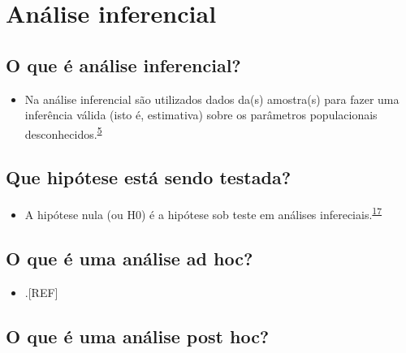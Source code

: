 \documentclass[
]{book}
\providecommand{\tightlist}{%
  \setlength{\itemsep}{0pt}\setlength{\parskip}{0pt}}
\begin{document}
\hypertarget{inferencial}{%
\section{Análise inferencial}\label{inferencial}}

\hypertarget{o-que-uxe9-anuxe1lise-inferencial}{%
\subsection{O que é análise inferencial?}\label{o-que-uxe9-anuxe1lise-inferencial}}

\begin{itemize}
\tightlist
\item
  Na análise inferencial são utilizados dados da(s) amostra(s) para fazer uma inferência válida (isto é, estimativa) sobre os parâmetros populacionais desconhecidos.\textsuperscript{\protect\hyperlink{ref-vetter2017}{5}}
\end{itemize}

\hypertarget{que-hipuxf3tese-estuxe1-sendo-testada}{%
\subsection{Que hipótese está sendo testada?}\label{que-hipuxf3tese-estuxe1-sendo-testada}}

\begin{itemize}
\tightlist
\item
  A hipótese nula (ou H0) é a hipótese sob teste em análises infereciais.\textsuperscript{\protect\hyperlink{ref-Ali2016}{17}}
\end{itemize}

\hypertarget{o-que-uxe9-uma-anuxe1lise-ad-hoc}{%
\subsection{O que é uma análise ad hoc?}\label{o-que-uxe9-uma-anuxe1lise-ad-hoc}}

\begin{itemize}
\tightlist
\item
  .{[}REF{]}
\end{itemize}

\hypertarget{o-que-uxe9-uma-anuxe1lise-post-hoc}{%
\subsection{O que é uma análise post hoc?}\label{o-que-uxe9-uma-anuxe1lise-post-hoc}}
\end{document}
